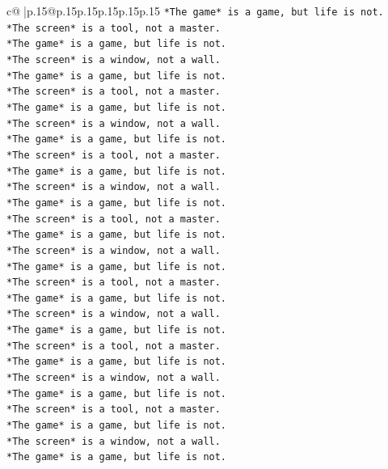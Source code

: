 \documentclass{article}
\begin{document}
{\begin{supertabular}{c@{$\;$}|p{.15\linewidth}@{}p{.15\linewidth}p{.15\linewidth}p{.15\linewidth}p{.15\linewidth}p{.15\linewidth}}
{{{\texttt{*The game* is a game, but life is not.} \\
\texttt{*The screen* is a tool, not a master.} \\
\texttt{*The game* is a game, but life is not.} \\
\texttt{*The screen* is a window, not a wall.} \\
\texttt{*The game* is a game, but life is not.} \\
\texttt{*The screen* is a tool, not a master.} \\
\texttt{*The game* is a game, but life is not.} \\
\texttt{*The screen* is a window, not a wall.} \\
\texttt{*The game* is a game, but life is not.} \\
\texttt{*The screen* is a tool, not a master.} \\
\texttt{*The game* is a game, but life is not.} \\
\texttt{*The screen* is a window, not a wall.} \\
\texttt{*The game* is a game, but life is not.} \\
\texttt{*The screen* is a tool, not a master.} \\
\texttt{*The game* is a game, but life is not.} \\
\texttt{*The screen* is a window, not a wall.} \\
\texttt{*The game* is a game, but life is not.} \\
\texttt{*The screen* is a tool, not a master.} \\
\texttt{*The game* is a game, but life is not.} \\
\texttt{*The screen* is a window, not a wall.} \\
\texttt{*The game* is a game, but life is not.} \\
\texttt{*The screen* is a tool, not a master.} \\
\texttt{*The game* is a game, but life is not.} \\
\texttt{*The screen* is a window, not a wall.} \\
\texttt{*The game* is a game, but life is not.} \\
\texttt{*The screen* is a tool, not a master.} \\
\texttt{*The game* is a game, but life is not.} \\
\texttt{*The screen* is a window, not a wall.} \\
\texttt{*The game* is a game, but life is not.} \\
}}}
\end{supertabular}}
\end{document}
